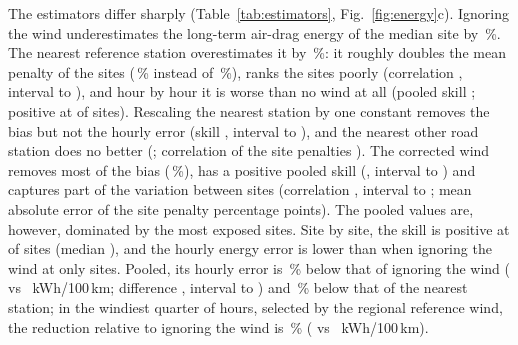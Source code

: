 The estimators differ sharply (Table~\ref{tab:estimators}, Fig.~\ref{fig:energy}c). Ignoring the wind underestimates the long-term air-drag energy of the median site by \enBiasNoNone\,\%. The nearest reference station overestimates it by \enBiasNoRaw\,\%: it roughly doubles the mean penalty of the sites (\enRoadMeanNoRaw\,\% instead of \enRoadMeanNoTrue\,\%), ranks the sites poorly (correlation \enRoadCorrNoRaw, interval \enRoadCorrNoRawLo{} to \enRoadCorrNoRawHi), and hour by hour it is worse than no wind at all (pooled skill \enSsNoRaw; positive at \enStPosNoRaw{} of \enNoStations{} sites). Rescaling the nearest station by one constant removes the bias but not the hourly error (skill \enSsNoResc, interval \enSsNoRescLo{} to \enSsNoRescHi), and the nearest other road station does no better (\enSsNoRoad; correlation of the site penalties \enRoadCorrNoRoad). The corrected wind removes most of the bias (\enBiasNoCor\,\%), has a positive pooled skill (\enSsNoCor, interval \enSsNoCorLo{} to \enSsNoCorHi) and captures part of the variation between sites (correlation \enRoadCorrNoCor, interval \enRoadCorrNoCorLo{} to \enRoadCorrNoCorHi; mean absolute error of the site penalty \enRoadMaeNoCor{} percentage points). The pooled values are, however, dominated by the most exposed sites. Site by site, the skill is positive at \enStPosNoCor{} of \enNoStations{} sites (median \enStSsNoCor), and the hourly energy error is lower than when ignoring the wind at only \enStGainNoCor{} sites. Pooled, its hourly error is \enMaeGainNo\,\% below that of ignoring the wind (\enMaeNoCor{} vs \enMaeNoNone~kWh/100\,km; difference \enDNoCorNoneMae, interval \enDNoCorNoneMaeLo{} to \enDNoCorNoneMaeHi) and \enMaeGainRawNo\,\% below that of the nearest station; in the windiest quarter of hours, selected by the regional reference wind, the reduction relative to ignoring the wind is \enCondGainNo\,\% (\enCondNoCor{} vs \enCondNoNone~kWh/100\,km).

